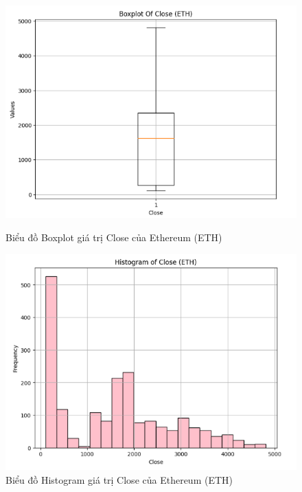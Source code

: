 \documentclass[conference]{IEEEtran}
\begin{document}
\begin{figure}[H]
    \centering
    \begin{minipage}{0.23\textwidth}
    \centering
    \includegraphics[width=1\textwidth]{Figure/ETHBoxplot.png}
    \caption{Biểu đồ Boxplot giá trị Close của Ethereum (ETH)}
    \label{fig:1}
    \end{minipage}
    \hfill
    \begin{minipage}{0.23\textwidth}
    \centering
    \includegraphics[width=1\textwidth]{Figure/ETHHistogram.png}
    \caption{Biểu đồ Histogram giá trị Close của Ethereum (ETH)}
    \label{fig:2}
    \end{minipage}
\end{figure}
\end{document}
